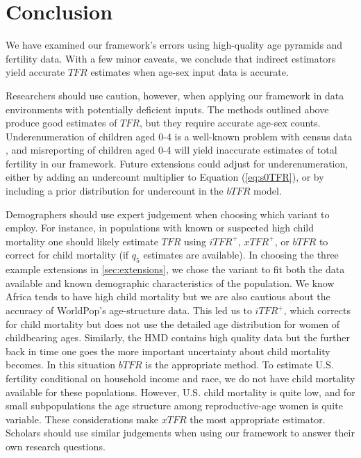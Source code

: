 \documentclass[12pt]{article}
\begin{document}
\hypertarget{conclusion}{%
\section{Conclusion}\label{conclusion}}

We have examined our framework's errors using high-quality age pyramids
and fertility data. With a few minor caveats, we conclude that indirect
estimators yield accurate \(TFR\) estimates when age-sex input data is
accurate.

Researchers should use caution, however, when applying our framework in
data environments with potentially deficient inputs. The methods
outlined above produce good estimates of \(TFR\), but they require
accurate age-sex counts. Underenumeration of children aged 0-4 is a
well-known problem with census data
\citep{ewbank1981age, o2014historical, o2015coverage}, and misreporting
of children aged 0-4 will yield inaccurate estimates of total fertility
in our framework. Future extensions could adjust for underenumeration,
either by adding an undercount multiplier to Equation (\ref{eq:s0TFR}),
or by including a prior distribution for undercount in the \(bTFR\)
model.

Demographers should use expert judgement when choosing which variant to
employ. For instance, in populations with known or suspected high child
mortality one should likely estimate \(TFR\) using \(iTFR^+\),
\(xTFR^+\), or \(bTFR\) to correct for child mortality (if \(q_5\)
estimates are available). In choosing the three example extensions in
\autoref{sec:extensions}, we chose the variant to fit both the data
available and known demographic characteristics of the population. We
know Africa tends to have high child mortality but we are also cautious
about the accuracy of WorldPop's age-structure data. This led us to
\(iTFR^+\), which corrects for child mortality but does not use the
detailed age distribution for women of childbearing ages. Similarly, the
HMD contains high quality data but the further back in time one goes the
more important uncertainty about child mortality becomes. In this
situation \(bTFR\) is the appropriate method. To estimate U.S. fertility
conditional on household income and race, we do not have child mortality
available for these populations. However, U.S. child mortality is quite
low, and for small subpopulations the age structure among
reproductive-age women is quite variable. These considerations make
\(xTFR\) the most appropriate estimator. Scholars should use similar
judgements when using our framework to answer their own research
questions.
\end{document}
